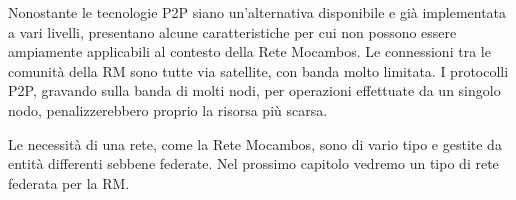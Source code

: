 Nonostante le tecnologie P2P siano un'alternativa disponibile e già
implementata a vari livelli, presentano alcune caratteristiche per cui
non possono essere ampiamente applicabili al contesto della Rete
Mocambos. Le connessioni tra le comunità della RM sono tutte via
satellite, con banda molto limitata. I protocolli P2P, gravando sulla
banda di molti nodi, per operazioni effettuate da un singolo nodo,
penalizzerebbero proprio la risorsa più scarsa. 

Le necessità di una rete, come la Rete Mocambos, sono di vario tipo e
gestite da entità differenti sebbene federate. Nel prossimo capitolo
vedremo un tipo di rete federata per la RM.

